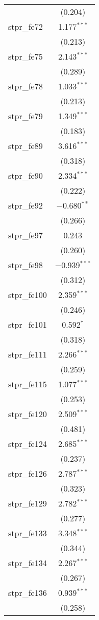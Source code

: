 \begin{table}[!htbp]
\begin{tabular}{@{\extracolsep{5pt}}lc}
  & (0.204) \\ 
  stpr\_fe72 & 1.177$^{***}$ \\ 
  & (0.213) \\ 
  stpr\_fe75 & 2.143$^{***}$ \\ 
  & (0.289) \\ 
  stpr\_fe78 & 1.033$^{***}$ \\ 
  & (0.213) \\ 
  stpr\_fe79 & 1.349$^{***}$ \\ 
  & (0.183) \\ 
  stpr\_fe89 & 3.616$^{***}$ \\ 
  & (0.318) \\ 
  stpr\_fe90 & 2.334$^{***}$ \\ 
  & (0.222) \\ 
  stpr\_fe92 & $-$0.680$^{**}$ \\ 
  & (0.266) \\ 
  stpr\_fe97 & 0.243 \\ 
  & (0.260) \\ 
  stpr\_fe98 & $-$0.939$^{***}$ \\ 
  & (0.312) \\ 
  stpr\_fe100 & 2.359$^{***}$ \\ 
  & (0.246) \\ 
  stpr\_fe101 & 0.592$^{*}$ \\ 
  & (0.318) \\ 
  stpr\_fe111 & 2.266$^{***}$ \\ 
  & (0.259) \\ 
  stpr\_fe115 & 1.077$^{***}$ \\ 
  & (0.253) \\ 
  stpr\_fe120 & 2.509$^{***}$ \\ 
  & (0.481) \\ 
  stpr\_fe124 & 2.685$^{***}$ \\ 
  & (0.237) \\ 
  stpr\_fe126 & 2.787$^{***}$ \\ 
  & (0.323) \\ 
  stpr\_fe129 & 2.782$^{***}$ \\ 
  & (0.277) \\ 
  stpr\_fe133 & 3.348$^{***}$ \\ 
  & (0.344) \\ 
  stpr\_fe134 & 2.267$^{***}$ \\ 
  & (0.267) \\ 
  stpr\_fe136 & 0.939$^{***}$ \\ 
  & (0.258) \\ 

\end{tabular}
\end{table}
